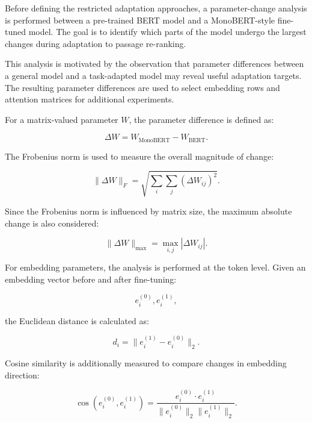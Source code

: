 Before defining the restricted adaptation approaches, a parameter-change analysis is performed between a pre-trained BERT model and a MonoBERT-style fine-tuned model. The goal is to identify which parts of the model undergo the largest changes during adaptation to passage re-ranking.

This analysis is motivated by the observation that parameter differences between a general model and a task-adapted model may reveal useful adaptation targets. The resulting parameter differences are used to select embedding rows and attention matrices for additional experiments.

For a matrix-valued parameter $W$, the parameter difference is defined as:

\begin{equation}
    \Delta W = W_{\text{MonoBERT}} - W_{\text{BERT}}.
\end{equation}

The Frobenius norm is used to measure the overall magnitude of change:

\begin{equation}
    \|\Delta W\|_F =
    \sqrt{
    \sum_i \sum_j (\Delta W_{ij})^2
    }.
\end{equation}

Since the Frobenius norm is influenced by matrix size, the maximum absolute change is also considered:

\begin{equation}
    \|\Delta W\|_{\max}
    =
    \max_{i,j} |\Delta W_{ij}|.
\end{equation}

For embedding parameters, the analysis is performed at the token level. Given an embedding vector before and after fine-tuning:

\begin{equation}
    e_i^{(0)}, e_i^{(1)},
\end{equation}

the Euclidean distance is calculated as:

\begin{equation}
    d_i =
    \|e_i^{(1)}-e_i^{(0)}\|_2.
\end{equation}

Cosine similarity is additionally measured to compare changes in embedding direction:

\begin{equation}
    \operatorname{cos}(e_i^{(0)},e_i^{(1)})
    =
    \frac{
    e_i^{(0)} \cdot e_i^{(1)}
    }{
    \|e_i^{(0)}\|_2
    \|e_i^{(1)}\|_2
    }.
\end{equation}

